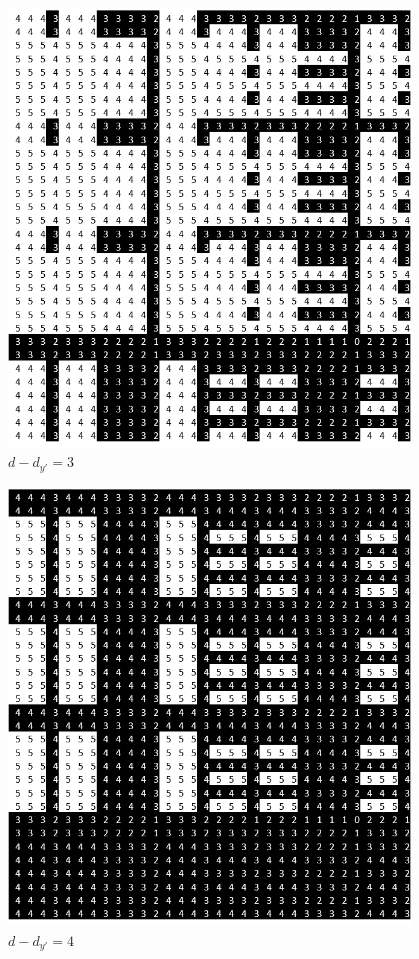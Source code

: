\documentclass[oneside,12pt]{DISCSthesis}
\begin{document}
{\begin{figure}[h]
				\newline\vspace*{20pt}\newline
				\begin{minipage}{.33\textwidth} \centering \includegraphics[width=0.95\textwidth]{img/3} $d-d_{y'} = 3$ \end{minipage}%
				\begin{minipage}{.33\textwidth} \centering \includegraphics[width=0.95\textwidth]{img/4} $d-d_{y'} = 4$ \end{minipage}%

\end{figure}}
\end{document}
